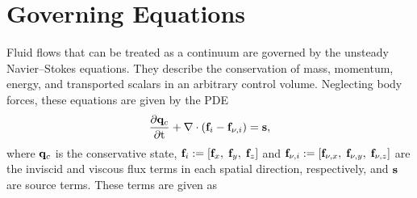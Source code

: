 \section{Governing Equations}\label{sec:govEqs}

Fluid flows that can be treated as a continuum are governed by the unsteady Navier--Stokes equations. They describe the conservation of mass, momentum, energy, and transported scalars in an arbitrary control volume. Neglecting body forces, these equations are given by the PDE
%
\begin{equation}\label{eq:gemsGovPDE}
    \frac{\partial \mathbf{q}_{c}}{\partial \text{t}} + \nabla \cdot (\mathbf{f}_{i} - \mathbf{f}_{\nu,i}) = \mathbf{s},
\end{equation}
%
where $\mathbf{q}_{c}$ is the conservative state, $\mathbf{f}_{i} := [\mathbf{f}_x, \; \mathbf{f}_y, \; \mathbf{f}_z]$ and $\mathbf{f}_{\nu,i} := [\mathbf{f}_{\nu,x}, \; \mathbf{f}_{\nu,y}, \; \mathbf{f}_{\nu,z}]$ are the inviscid and viscous flux terms in each spatial direction, respectively, and $\mathbf{s}$ are source terms. These terms are given as
%
